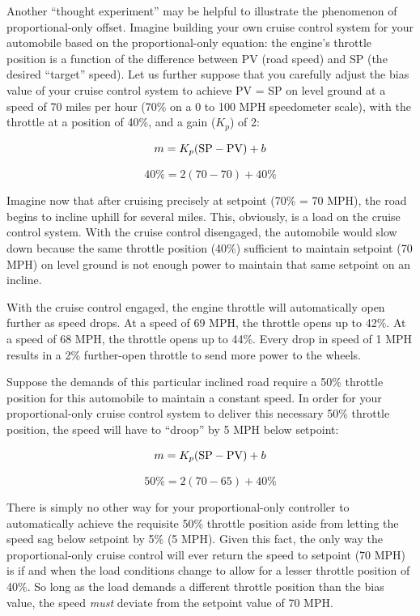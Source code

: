 \vskip 10pt

\filbreak

Another ``thought experiment'' may be helpful to illustrate the phenomenon of proportional-only offset.  Imagine building your own cruise control system for your automobile based on the proportional-only equation: the engine's throttle position is a function of the difference between PV (road speed) and SP (the desired ``target'' speed).  Let us further suppose that you carefully adjust the bias value of your cruise control system to achieve PV = SP on level ground at a speed of 70 miles per hour (70\% on a 0 to 100 MPH speedometer scale), with the throttle at a position of 40\%, and a gain ($K_p$) of 2:

$$m = K_p (\hbox{SP} - \hbox{PV}) + b$$

$$40\% = 2 (70 - 70) + 40\%$$

Imagine now that after cruising precisely at setpoint (70\% = 70 MPH), the road begins to incline uphill for several miles.  This, obviously, is a load on the cruise control system.  With the cruise control disengaged, the automobile would slow down because the same throttle position (40\%) sufficient to maintain setpoint (70 MPH) on level ground is not enough power to maintain that same setpoint on an incline.  

With the cruise control engaged, the engine throttle will automatically open further as speed drops.  At a speed of 69 MPH, the throttle opens up to 42\%.  At a speed of 68 MPH, the throttle opens up to 44\%.  Every drop in speed of 1 MPH results in a 2\% further-open throttle to send more power to the wheels.

Suppose the demands of this particular inclined road require a 50\% throttle position for this automobile to maintain a constant speed.  In order for your proportional-only cruise control system to deliver this necessary 50\% throttle position, the speed will have to ``droop'' by 5 MPH below setpoint:

$$m = K_p (\hbox{SP} - \hbox{PV}) + b$$

$$50\% = 2 (70 - 65) + 40\%$$

There is simply no other way for your proportional-only controller to automatically achieve the requisite 50\% throttle position aside from letting the speed sag below setpoint by 5\% (5 MPH).  Given this fact, the only way the proportional-only cruise control will ever return the speed to setpoint (70 MPH) is if and when the load conditions change to allow for a lesser throttle position of 40\%.  So long as the load demands a different throttle position than the bias value, the speed \textit{must} deviate from the setpoint value of 70 MPH.

